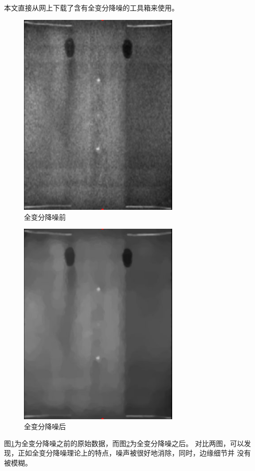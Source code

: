 本文直接从网上下载了含有全变分降噪的工具箱来使用。
\begin{figure}[!h]\label{fig:beforeTV}
\center
\includegraphics[width=0.7\textwidth]{figure/patternp/beforeTV.jpg}
\caption{全变分降噪前}
\end{figure}
\begin{figure}[!h]\label{fig:afterTV}
\center
\includegraphics[width=0.7\textwidth]{figure/patternp/afterTV.jpg}
\caption{全变分降噪后}
\end{figure}
图\ref{fig:beforeTV}为全变分降噪之前的原始数据，而图\ref{fig:afterTV}为全变分降噪之后。
对比两图，可以发现，正如全变分降噪理论上的特点，噪声被很好地消除，同时，边缘细节并
没有被模糊。


